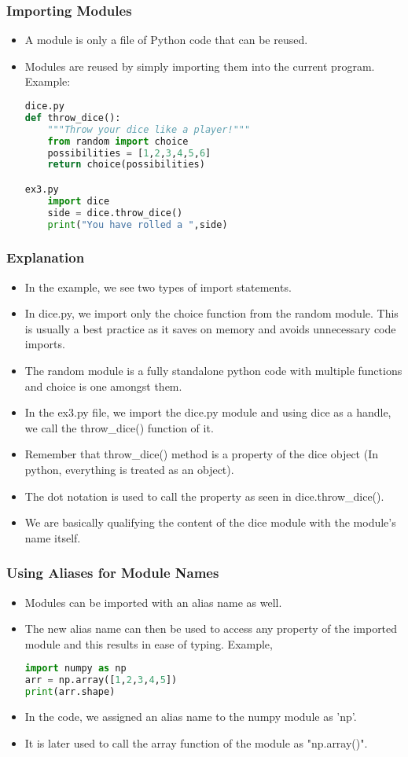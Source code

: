 \documentclass{beamer}
\begin{document}
\begin{frame}[fragile]
\frametitle{Importing Modules}
\begin{itemize}
\item A module is only a file of Python code that can be reused.
\item Modules are reused by simply importing them into the current program. Example:
\begin{lstlisting}[language=Python]
dice.py
def throw_dice():
	"""Throw your dice like a player!"""
	from random import choice
	possibilities = [1,2,3,4,5,6]
	return choice(possibilities)

ex3.py
	import dice
	side = dice.throw_dice()
	print("You have rolled a ",side)
\end{lstlisting}
\end{itemize}
\end{frame}

\begin{frame}[fragile]
\frametitle{Explanation}
\begin{itemize}
\item In the example, we see two types of import statements.
\item In dice.py, we import only the choice function from the random module. This is usually a best practice as it saves on memory and avoids unnecessary code imports.
\item The random module is a fully standalone python code  with multiple functions and choice is one amongst them.
\item In the ex3.py file, we import the dice.py module and using dice as a handle, we call the throw\_dice() function of it.
\item Remember that throw\_dice() method is a property  of the dice object (In python, everything is treated as an object).
\item The dot notation is used to call the property as seen in dice.throw\_dice().
\item We are basically qualifying the content of the dice module with the module's name itself.
\end{itemize}
\end{frame}

\begin{frame}[fragile]
\frametitle{Using Aliases for Module Names}
\begin{itemize}
\item Modules can be imported with an alias name as well.
\item The new alias name can then be used to access any property of the imported module and this results in ease of typing.
Example,
\begin{lstlisting}[language=Python]
import numpy as np
arr = np.array([1,2,3,4,5])
print(arr.shape)
\end{lstlisting}
\item In the code, we assigned an alias name to the numpy module as 'np'.
\item It is later used to call the array function of the module as "np.array()".
\end{itemize}
\end{frame}
\end{document}

